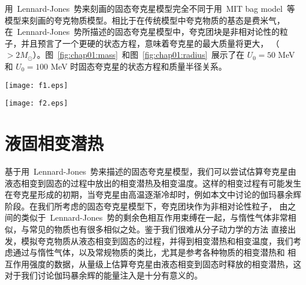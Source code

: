 	用~Lennard-Jones~势来刻画的固态夸克星模型完全不同于用~MIT bag model~等模型来刻画的夸克物质模型。相比于在传统模型中夸克物质的基态是费米气，
	在~Lennard-Jones~势所描述的固态夸克星模型中，夸克团块是非相对论性的粒子，并且预言了一个更硬的状态方程，意味着夸克星的最大质量将更大，
	（$>2M_{\odot}$）。图~\ref{fig:chap01:mass}~和图~\ref{fig:chap01:radius}~展示了在 $U_{0}=50$ MeV 和 $U_{0}=100$ MeV 时固态夸克星的状态方程和质量半径关系。

	\begin{figure*}
	\texttt{[image: f1.eps]}
	\caption{状态方程，$N_{\rm q}=3$，$U_0=50$ MeV （蓝色实线），$U_0=100$ MeV
		（蓝色虚线）； $N_{\rm q}=18$，$U_0=50$ MeV （红色虚点线），$U_0=100$ MeV
			（红色点线）。夸克质量为 $m_{\rm s}=100$ MeV ， 强相互总用耦合常数为
			$\alpha_{\rm s}=0.3$，口袋常数为 $B=60 \rm MeV / fm^{-3}$ 的口袋模型
			的结果（细线），所用的表面密度为 $\rho_{\rm s}=2\rho_0$，$\rho_0$ 是
			核饱和密度。}
			\label{fig:chap01:mass}
			\end{figure*}

			\begin{figure*}
			  \texttt{[image: f2.eps]}
				\caption{质量半径关系和质量中心密度关系。$N_{\rm q}=3$，$U_0=50$ MeV （蓝色实线），
					$U_0=100$ MeV （蓝色虚线）。$N_{\rm q}=18$，$U_0=50$ MeV （红色虚点线），
						$U_0=100$ MeV 红色点线，表面密度均取 $\rho_{\rm s}=2\rho_0$。}
						\label{fig:chap01:radius}
						\end{figure*}


						\section{液固相变潜热}
						\label{chap2:sec2}

						基于用~Lennard-Jones~势来描述的固态夸克星模型，我们可以尝试估算夸克星由液态相变到固态的过程中放出的相变潜热及相变温度。这样的相变过程有可能发生
						在夸克星形成的初期，当夸克星由高温逐渐冷却时，例如本文中讨论的伽玛暴余辉阶段。在我们所考虑的固态夸克星模型下，夸克团块作为非相对论性粒子，
						由之间的类似于~Lennard-Jones~势的剩余色相互作用束缚在一起，与惰性气体非常相似，与常见的物质也有很多相似之处。鉴于我们很难从分子动力学的方法
						直接出发，模拟夸克物质从液态相变到固态的过程，并得到相变潜热和相变温度，我们考虑通过与惰性气体，以及常规物质的类比，尤其是参考各种物质的相变潜热和
						相互作用强度的数据，从量级上估算夸克星由液态相变到固态时释放的相变潜热，这对于我们讨论伽玛暴余辉的能量注入是十分有意义的。

